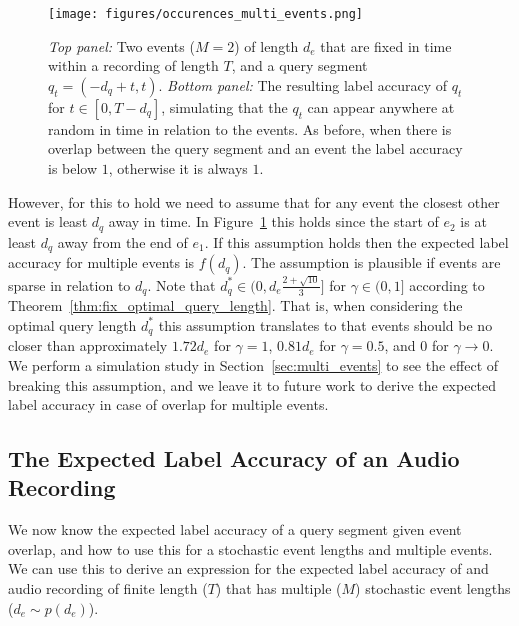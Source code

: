\begin{figure}
    \centering
    \texttt{[image: figures/occurences\_multi\_events.png]}
    \caption{
    \textit{Top panel:}  Two events ($M=2$) of length $d_e$ that are fixed in time within a recording of length $T$, and a query segment $q_t = (-d_q + t, t)$. \textit{Bottom panel:} The resulting label accuracy of $q_t$ for $t\in [0, T-d_q]$, simulating that the $q_t$ can appear anywhere at random in time in relation to the events. As before, when there is overlap between the query segment and an event the label accuracy is below $1$, otherwise it is always $1$.
    }
    \label{fig:multiple_events}
\end{figure}

However, for this to hold we need to assume that for any event the closest other event is least $d_q$ away in time. In Figure~\ref{fig:multiple_events} this holds since the start of $e_2$ is at least $d_q$ away from the end of $e_1$. If this assumption holds then the expected label accuracy for multiple events is $f(d_q)$. The assumption is plausible if events are sparse in relation to $d_q$. Note that $d_q^* \in (0, d_e\frac{2 + \sqrt{10}}{3}]$ for $\gamma \in (0, 1]$ according to Theorem~\ref{thm:fix_optimal_query_length}. That is, when considering the optimal query length $d_q^*$ this assumption translates to that events should be no closer than approximately $1.72d_e$ for $\gamma = 1$, $0.81d_e$ for $\gamma = 0.5$, and $0$ for $\gamma \rightarrow 0$. We perform a simulation study in Section~\ref{sec:multi_events} to see the effect of breaking this assumption, and we leave it to future work to derive the expected label accuracy in case of overlap for multiple events.

\subsection{The Expected Label Accuracy of an Audio Recording}
\label{sec:expected_label_accuracy_all_cases}
We now know the expected label accuracy of a query segment given event overlap, and how to use this for a stochastic event lengths and multiple events. We can use this to derive an expression for the expected label accuracy of and audio recording of finite length ($T$) that has multiple ($M$) stochastic event lengths ($d_e\sim p(d_e)$).

